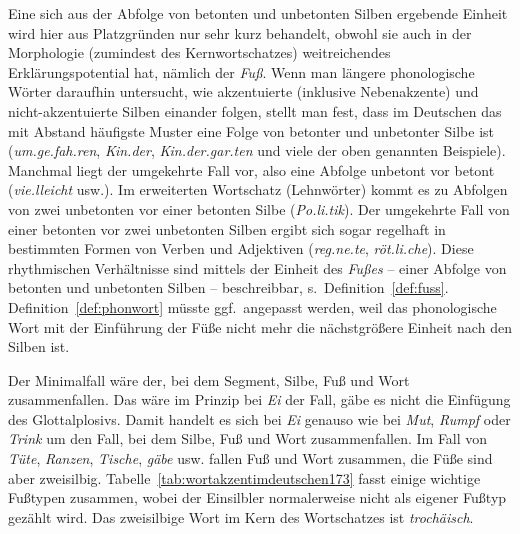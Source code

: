 Eine sich aus der Abfolge von betonten und unbetonten Silben ergebende Einheit wird hier aus Platzgründen nur sehr kurz behandelt, obwohl sie auch in der Morphologie (zumindest des Kernwortschatzes) weitreichendes Erklärungspotential hat, nämlich der \textit{Fuß}.
Wenn man längere phonologische Wörter daraufhin untersucht, wie akzentuierte (inklusive Nebenakzente) und nicht-akzentuierte Silben einander folgen, stellt man fest, dass im Deutschen das mit Abstand häufigste Muster eine Folge von betonter und unbetonter Silbe ist (\textit{\Akz um.ge.\Nakz fah.ren}, \textit{\Akz Kin.der}, \textit{\Akz Kin.der.\Nakz gar.ten} und viele der oben genannten Beispiele).
Manchmal liegt der umgekehrte Fall vor, also eine Abfolge unbetont vor betont (\textit{vie.\Akz lleicht} usw.).
Im erweiterten Wortschatz (\idR Lehnwörter) kommt es zu Abfolgen von zwei unbetonten vor einer betonten Silbe (\textit{Po.li.\Akz tik}).
Der umgekehrte Fall von einer betonten vor zwei unbetonten Silben ergibt sich sogar regelhaft in bestimmten Formen von Verben und Adjektiven (\textit{\Akz reg.ne.te}, \textit{\Akz röt.li.che}).
Diese rhythmischen Verhältnisse sind mittels der Einheit des \textit{Fußes} -- einer Abfolge von betonten und unbetonten Silben -- beschreibbar, s.\ Definition~\ref{def:fuss}.
Definition~\ref{def:phonwort} müsste ggf.\ angepasst werden, weil das phonologische Wort mit der Einführung der Füße nicht mehr die nächstgrößere Einheit nach den Silben ist.

\Stretch

{}

Der Minimalfall wäre der, bei dem Segment, Silbe, Fuß und Wort zusammenfallen.
Das wäre im Prinzip bei \textit{Ei} der Fall, gäbe es nicht die Einfügung des Glottalplosivs.
Damit handelt es sich bei \textit{Ei} genauso wie bei \textit{Mut}, \textit{Rumpf} oder \textit{Trink} um den Fall, bei dem Silbe, Fuß und Wort zusammenfallen.
Im Fall von \textit{\Akz Tüte}, \textit{\Akz Ranzen}, \textit{\Akz Tische}, \textit{\Akz gäbe} usw. fallen Fuß und Wort zusammen, die Füße sind aber zweisilbig.
Tabelle~\ref{tab:wortakzentimdeutschen173} fasst einige wichtige Fußtypen zusammen, wobei der Einsilbler normalerweise nicht als eigener Fußtyp gezählt wird.
Das zweisilbige Wort im Kern des Wortschatzes ist \textit{trochäisch}.

